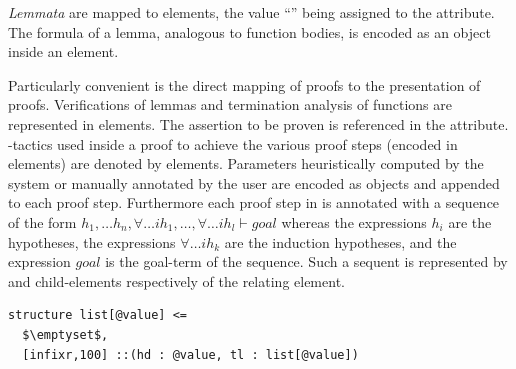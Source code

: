 {\emph{Lemmata}} are mapped to {} elements, the value
``{}'' being assigned to the {}
attribute. The formula of a lemma, analogous to function bodies, is encoded as an
{\openmath} object inside an {} element.

Particularly convenient is the direct mapping of {\verifun} proofs to the {\omdoc}
presentation of proofs. Verifications of lemmas and termination analysis of functions are
represented in {} elements. The assertion to be proven is referenced in the
{} attribute. {}-tactics used inside a proof to achieve the
various proof steps (encoded in { elements}) are denoted by
{} elements. Parameters heuristically computed by the system or manually
annotated by the user are encoded as {\openmath} objects and appended to each proof
step. Furthermore each proof step in {\verifun} is annotated with a sequence of the form
$h_1, \dots h_n, \forall \dots ih_1, \dots, \forall \dots ih_l \vdash goal$ whereas the
expressions $h_i$ are the hypotheses, the expressions $\forall \dots ih_k$ are the
induction hypotheses, and the expression $goal$ is the goal-term of the sequence. Such a
sequent is represented by {} and {} child-elements
respectively of the relating {} element.
\begin{lstlisting}[escapechar=\%,mathescape,label=lst:vf:adt,caption={A polymorphic {\verifun} sort}]
structure list[@value] <=
  $\emptyset$,
  [infixr,100] ::(hd : @value, tl : list[@value])
\end{lstlisting}

